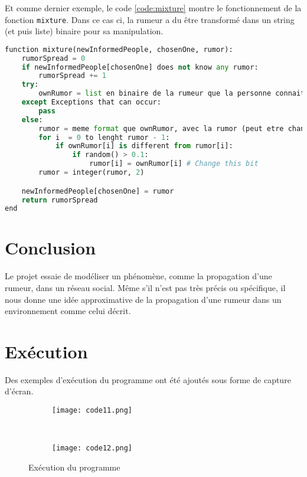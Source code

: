 \documentclass[11pt,a4paper]{article}
\begin{document}
Et comme dernier exemple, le code \ref{code:mixture} montre le fonctionnement de la fonction \texttt{mixture}. Dans ce cas ci, la rumeur a du être transformé dans un string (et puis liste) binaire pour sa manipulation.

\begin{lstlisting}[label={code:mixture},language=Python, caption=Fonction mixture]
function mixture(newInformedPeople, chosenOne, rumor):
    rumorSpread = 0
    if newInformedPeople[chosenOne] does not know any rumor:
        rumorSpread += 1
    try:
        ownRumor = list en binaire de la rumeur que la personne connait
    except Exceptions that can occur:
        pass
    else:
        rumor = meme format que ownRumor, avec la rumor (peut etre changee)
        for i  = 0 to lenght rumor - 1:
            if ownRumor[i] is different from rumor[i]:
                if random() > 0.1:
                    rumor[i] = ownRumor[i] # Change this bit
        rumor = integer(rumor, 2)

    newInformedPeople[chosenOne] = rumor
    return rumorSpread
end
\end{lstlisting}

\section{Conclusion}

Le projet essaie de modéliser un phénomène, comme la propagation d'une rumeur, dans un réseau social. Même s'il n'est pas très précis ou spécifique, il nous donne une idée approximative de la propagation d'une rumeur dans un environnement comme celui décrit.




\nocite{*}



\newpage

\appendix

\section{Exécution}

Des exemples d'exécution du programme ont été ajoutés sous forme de capture d'écran.

\begin{figure}[!ht]
        \centering
        \begin{subfigure}[b]{0.5\textwidth}
                \texttt{[image: code11.png]}
        \end{subfigure}%
        ~
        \begin{subfigure}[b]{0.35\textwidth}
                \texttt{[image: code12.png]}
        \end{subfigure}
        \caption{Exécution du programme}\label{fig:code1}
\end{figure}
\end{document}
